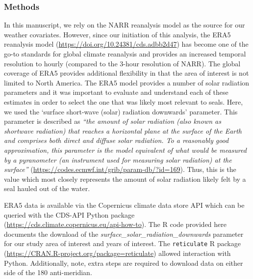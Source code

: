 \documentclass[fleqn,10pt,lineno]{wlpeerj} %
\begin{document}
\subsubsection{Methods}\label{methods-1}

In this manuscript, we rely on the NARR reanalysis model as the source for our
weather covariates. However, since our initiation of this analysis, the ERA5
reanalysis model (\url{https://doi.org/10.24381/cds.adbb2d47}) has become one of the
go-to standards for global climate reanalysis and provides an increased temporal
resolution to hourly (compared to the 3-hour resolution of NARR). The global
coverage of ERA5 provides additional flexibility in that the area of interest is
not limited to North America. The ERA5 model provides a number of solar
radiation parameters and it was important to evaluate and understand each of
these estimates in order to select the one that was likely most relevant to
seals. Here, we used the `surface short-wave (solar) radiation downwards'
parameter. This
parameter is described as \emph{``the amount of solar radiation (also known as shortwave radiation)
that reaches a horizontal plane at the surface of the Earth and comprises both
direct and diffuse solar radiation. To a reasonably good approximation, this
parameter is the model equivalent of what would be measured by a pyranometer (an
instrument used for measuring solar radiation) at the surface''}
(\url{https://codes.ecmwf.int/grib/param-db/?id=169}). Thus, this is the
value which most closely represents the amount of solar radiation likely
felt by a seal hauled out of the water.

ERA5 data is available via the Copernicus climate data store API which can be
queried with the CDS-API Python package
(\url{https://cds.climate.copernicus.eu/api-how-to}). The R code provided here
documents the download of the \emph{surface\_solar\_radiation\_downwards} parameter for
our study area of interest and years of interest. The \texttt{reticulate} R package
(\url{https://CRAN.R-project.org/package=reticulate}) allowed interaction with Python.
Additionally, note, extra steps are required to download data on either side
of the 180 anti-meridian.
\end{document}
